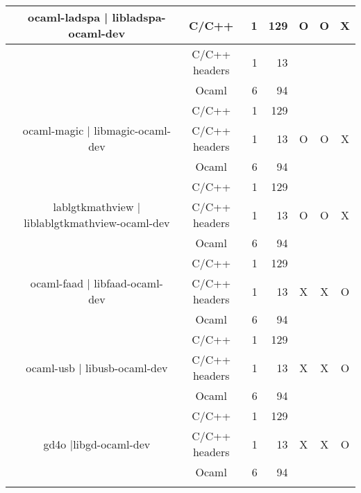 \documentclass[11pt,a4paper]{article}
\begin{document}
\begin{table}[h,t]
\begin{tabular}{|>{\centering}m{3cm}| c|c|r|r| c| c|c|}
 &\multirow{3}{3cm}{ocaml-ladspa | libladspa-ocaml-dev} & C/C++ & 1 & 129 & \multirow{3}{*}{O} & \multirow{3}{*}{O} & \multirow{3}{*}{X}\\
\cline{3-5}
& &                           C/C++ headers & 1 & 13 & & & \\
\cline{3-5}
& &                          Ocaml & 6 & 94 & & & \\
\cline{2-8}

 &\multirow{3}{3cm}{ocaml-magic | libmagic-ocaml-dev} & C/C++ & 1 & 129 & \multirow{3}{*}{O} & \multirow{3}{*}{O} & \multirow{3}{*}{X}\\
\cline{3-5}
& &                           C/C++ headers & 1 & 13 & & & \\
\cline{3-5}
& &                          Ocaml & 6 & 94 & & & \\
\cline{2-8}

 &\multirow{3}{3cm}{lablgtkmathview | liblablgtkmathview-ocaml-dev} & C/C++ & 1 & 129 & \multirow{3}{*}{O} & \multirow{3}{*}{O} & \multirow{3}{*}{X}\\
\cline{3-5}
& &                           C/C++ headers & 1 & 13 & & & \\
\cline{3-5}
& &                          Ocaml & 6 & 94 & & & \\
\cline{2-8}

&\multirow{3}{3cm}{ocaml-faad | libfaad-ocaml-dev} & C/C++ & 1 & 129 & \multirow{3}{*}{X} & \multirow{3}{*}{X} & \multirow{3}{*}{O}\\
\cline{3-5}
& &                           C/C++ headers & 1 & 13 & & & \\
\cline{3-5}
& &                          Ocaml & 6 & 94 & & & \\
\cline{2-8}

&\multirow{3}{3cm}{ocaml-usb | libusb-ocaml-dev} & C/C++ & 1 & 129 & \multirow{3}{*}{X} & \multirow{3}{*}{X} & \multirow{3}{*}{O}\\
\cline{3-5}
& &                           C/C++ headers & 1 & 13 & & & \\
\cline{3-5}
& &                          Ocaml & 6 & 94 & & & \\
\cline{2-8}


 &\multirow{3}{3cm}{gd4o |libgd-ocaml-dev} & C/C++ & 1 & 129 & \multirow{3}{*}{X} & \multirow{3}{*}{X} & \multirow{3}{*}{O}\\
\cline{3-5}
& &                           C/C++ headers & 1 & 13 & & & \\
\cline{3-5}
& &                          Ocaml & 6 & 94 & & & \\
\cline{2-8}







\end{tabular}
\end{table}
\end{document}
